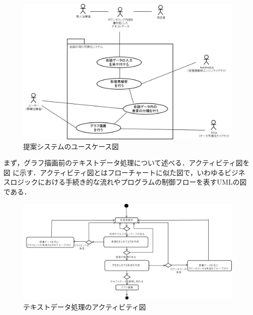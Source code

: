 \documentclass[shuuron]{kuee}
\begin{document}
\begin{figure}
   \begin{center}
      \includegraphics[width=\linewidth]{use_case_diagram.png}
   \end{center}
   \caption{提案システムのユースケース図}
   \label{fig:use_case_diagram}
 \end{figure}


まず，グラフ描画前のテキストデータ処理について述べる．アクティビティ図を図
に示す．アクティビティ図とはフローチャートに似た図で，いわゆるビジネスロジックにおける手続き的な流れやプログラムの制御フローを表すUMLの図である．
\begin{figure}
   \begin{center}
     \includegraphics[width=\linewidth]{activity.png}
   \end{center}
   \caption{テキストデータ処理のアクティビティ図}
   \label{fig:activity}
\end{figure}
\end{document}
